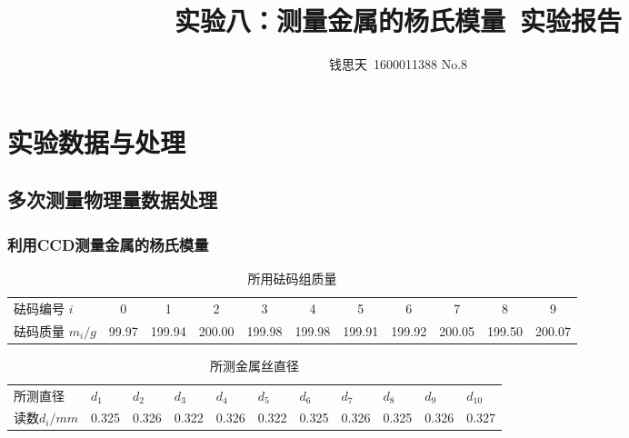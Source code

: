 \documentclass{ctexart}
\author{钱思天\ 1600011388 No.8}
\title{实验八：测量金属的杨氏模量\ 实验报告}
\begin{document}
      \maketitle
      \section{实验数据与处理}
      \subsection{多次测量物理量数据处理}
      \subsubsection{利用CCD测量金属的杨氏模量}
\begin{table}[H]
    \centering
    \caption{所用砝码组质量}
    \resizebox{\textwidth}{!}
    {
      \begin{tabular}{lcccccccccc}
      砝码编号 $i$ & 0     & 1     & 2     & 3     & 4     & 5     & 6     & 7     & 8     & 9 \\
      砝码质量 $m_i /g$ & 99.97 & 199.94 & 200.00 & 199.98 & 199.98 & 199.91 & 199.92 & 200.05 & 199.50 & 200.07 \\
      \end{tabular}%
    }
    \label{tab:addlabel}%
  \end{table}%
\begin{table}[H]
    \centering
    \caption{所测金属丝直径}
    \resizebox{\textwidth}{!}
    {
      \begin{tabular}{lrrrrrrrrrr}
      所测直径 & \multicolumn{1}{l}{$d_1$} & \multicolumn{1}{l}{$d_2$} & \multicolumn{1}{l}{$d_3$} & \multicolumn{1}{l}{$d_4$} & \multicolumn{1}{l}{$d_5$} & \multicolumn{1}{l}{$d_6$} & \multicolumn{1}{l}{$d_7$} & \multicolumn{1}{l}{$d_8$} & \multicolumn{1}{l}{$d_9$} & \multicolumn{1}{l}{$d_{10}$} \\
      读数$d_i/mm$    & 0.325 & 0.326 & 0.322 & 0.326 & 0.322 & 0.325 & 0.326 & 0.325 & 0.326 & 0.327 \\
      \end{tabular}%
    }
    \label{tab:addlabel}%
  \end{table}%
\end{document}
